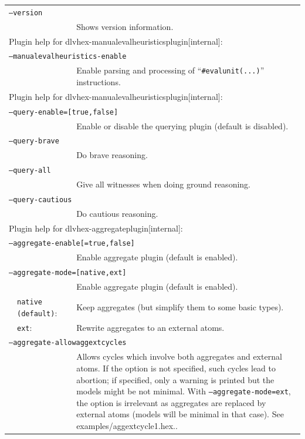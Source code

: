 \documentclass[a4paper, titlepage]{article}
\begin{document}
\begin{center}
\begin{longtable}{p{2.2cm}  p{2.5cm} p{0.6cm} p{6.3cm}  }
\multicolumn{4}{l}{\texttt{--version}}\\
& & & Shows version information.\\
\multicolumn{4}{l}{Plugin help for dlvhex-manualevalheuristicsplugin[internal]:}\\
\multicolumn{4}{l}{\texttt{--manualevalheuristics-enable}}\\
& & & Enable parsing and processing of ``\texttt{\#evalunit(...)}'' instructions.\\
\multicolumn{4}{l}{Plugin help for dlvhex-manualevalheuristicsplugin[internal]:}\\
\multicolumn{4}{l}{\texttt{--query-enable=[true,false]}}\\
& & & Enable or disable the querying plugin (default is disabled).\\
\multicolumn{4}{l}{\texttt{--query-brave}}\\
& & & Do brave reasoning.\\
\multicolumn{4}{l}{\texttt{--query-all}}\\
& & & Give all witnesses when doing ground reasoning.\\
\multicolumn{4}{l}{\texttt{--query-cautious}}\\
& & & Do cautious reasoning.\\
\multicolumn{4}{l}{Plugin help for dlvhex-aggregateplugin[internal]:}\\
\multicolumn{4}{l}{\texttt{--aggregate-enable[=true,false]}}\\
& & & Enable aggregate plugin (default is enabled).\\
\multicolumn{4}{l}{\texttt{--aggregate-mode=[native,ext]}}\\
& & & Enable aggregate plugin (default is enabled).\\
&\texttt{native (default)}:&& Keep aggregates (but simplify them to some basic types).\\
&\texttt{ext}:&& Rewrite aggregates to an external atoms.\\
\multicolumn{4}{l}{\texttt{--aggregate-allowaggextcycles}}\\
& & & Allows cycles which involve both aggregates and external atoms. If the option is not specified, such cycles lead to abortion; if specified, only a warning is printed but the models might be not minimal. With \texttt{--aggregate-mode=ext}, the option is irrelevant as aggregates are replaced by external atoms (models will be minimal in that case). See examples/aggextcycle1.hex..\\

\end{longtable}
\end{center}
\end{document}
